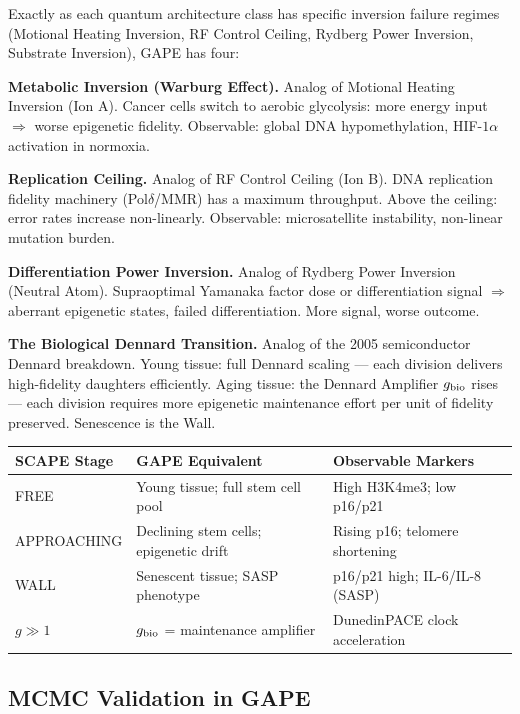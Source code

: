 \documentclass[12pt,a4paper]{article}
\begin{document}
Exactly as each quantum architecture class has specific inversion
failure regimes (Motional Heating Inversion, RF Control Ceiling,
Rydberg Power Inversion, Substrate Inversion), GAPE has four:

\textbf{Metabolic Inversion (Warburg Effect).}
Analog of Motional Heating Inversion (Ion A).
Cancer cells switch to aerobic glycolysis: more energy input
$\Rightarrow$ worse epigenetic fidelity. Observable: global DNA
hypomethylation, HIF-$1\alpha$ activation in normoxia.

\textbf{Replication Ceiling.}
Analog of RF Control Ceiling (Ion B).
DNA replication fidelity machinery (Pol$\delta$/MMR) has a maximum
throughput. Above the ceiling: error rates increase non-linearly.
Observable: microsatellite instability, non-linear mutation burden.

\textbf{Differentiation Power Inversion.}
Analog of Rydberg Power Inversion (Neutral Atom).
Supraoptimal Yamanaka factor dose or differentiation signal
$\Rightarrow$ aberrant epigenetic states, failed differentiation.
More signal, worse outcome.

\textbf{The Biological Dennard Transition.}
Analog of the 2005 semiconductor Dennard breakdown.
Young tissue: full Dennard scaling --- each division delivers
high-fidelity daughters efficiently.
Aging tissue: the Dennard Amplifier $g_{\rm bio}$ rises ---
each division requires more epigenetic maintenance effort per unit
of fidelity preserved. Senescence is the Wall.

\begin{center}
\begin{tabular}{lll}
\toprule
SCAPE Stage & GAPE Equivalent & Observable Markers \\
\midrule
FREE & Young tissue; full stem cell pool & High H3K4me3; low p16/p21 \\
APPROACHING & Declining stem cells; epigenetic drift & Rising p16; telomere shortening \\
WALL & Senescent tissue; SASP phenotype & p16/p21 high; IL-6/IL-8 (SASP) \\
$g \gg 1$ & $g_{\rm bio}$ = maintenance amplifier & DunedinPACE clock acceleration \\
\bottomrule
\end{tabular}
\end{center}

\subsection{MCMC Validation in GAPE}
\end{document}
